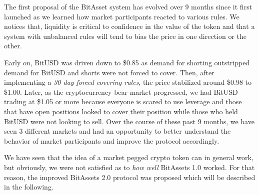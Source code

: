 \label{sec:bitassets1}

The first proposal of the BitAsset system has evolved over 9 months since it
first launched as we learned how market participants reacted to various rules.
We notices that, liquidity is critical to confidence in the value of the token
and that a system with unbalanced rules will tend to bias the price in one
direction or the other.

Early on, BitUSD was driven down to \$0.85 as demand for shorting outstripped
demand for BitUSD and shorts were not forced to cover. Then, after implementing
a \emph{30 day forced covering rules}, the price stabilized around \$0.98 to
\$1.00. Later, as the cryptocurrency bear market progressed, we had BitUSD
trading at \$1.05 or more because everyone is scared to use leverage and those
that have open positions looked to cover their position while those who held
BitUSD were not looking to sell. Over the course of these past 9 months, we
have seen 3 different markets and had an opportunity to better understand the
behavior of market participants and improve the protocol accordingly.

We have seen that the idea of a market pegged crypto token can in general work,
but obviously, we were not satisfied as to \emph{how well} BitAssets 1.0
worked. For that reason, the improved BitAssets 2.0 protocol was proposed which
will be described in the following.
